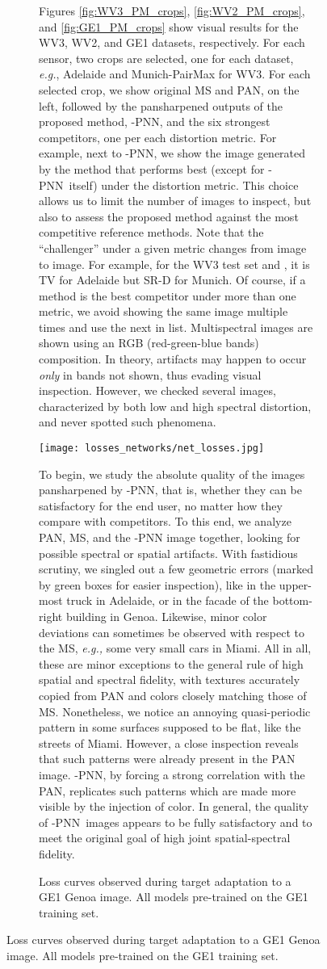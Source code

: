 \documentclass[journal]{IEEEtran}
\newcommand{\LPNN}  {-PNN}
\begin{document}
\begin{figure}
\begin{figure}
Figures \ref{fig:WV3_PM_crops}, \ref{fig:WV2_PM_crops}, and \ref{fig:GE1_PM_crops} show visual results for the WV3, WV2, and GE1 datasets, respectively.
For each sensor, two crops are selected, one for each dataset, {\it e.g.}, Adelaide and Munich-PairMax for WV3.
For each selected crop,
we show original MS and PAN, on the left,
followed by the pansharpened outputs of the proposed method, \LPNN, and the six strongest competitors, one per each distortion metric.
For example, next to \LPNN, we show the image generated by the method that performs best (except for \LPNN\ itself) under the  distortion metric.
This choice allows us to limit the number of images to inspect,
but also to assess the proposed method against the most competitive reference methods.
Note that the ``challenger'' under a given metric changes from image to image.
For example, for the WV3 test set and , it is TV for Adelaide but SR-D for Munich.
Of course, if a method is the best competitor under more than one metric, we avoid showing the same image multiple times and use the next in list.
Multispectral images are shown using an RGB (red-green-blue bands) composition.
In theory, artifacts may happen to occur {\em only} in bands not shown, thus evading visual inspection.
However, we checked several images, characterized by both low and high spectral distortion, and never spotted such phenomena.

\begin{figure*}[htbp]
\centering
\texttt{[image: losses\_networks/net\_losses.jpg]}
\caption{Loss curves observed during target adaptation to a GE1 Genoa image. All models pre-trained on the GE1 training set.}
\label{fig:network_effects}
\end{figure*}

To begin, we study the absolute quality of the images pansharpened by \LPNN,
that is, whether they can be satisfactory for the end user, no matter how they compare with competitors.
To this end, we analyze PAN, MS, and the {\LPNN} image together, looking for possible spectral or spatial artifacts.
With fastidious scrutiny, we singled out a few geometric errors (marked by green boxes for easier inspection), like in the upper-most truck in Adelaide,
or in the facade of the bottom-right building in Genoa.
Likewise, minor color deviations can sometimes be observed with respect to the MS, {\it e.g.,} some very small cars in Miami.
All in all, these are minor exceptions to the general rule of high spatial and spectral fidelity,
with textures accurately copied from PAN and colors closely matching those of MS.
Nonetheless, we notice an annoying quasi-periodic pattern in some surfaces supposed to be flat, like the streets of Miami.
However, a close inspection reveals that such patterns were already present in the PAN image.
\LPNN, by forcing a strong correlation with the PAN, replicates such patterns which are made more visible by the injection of color.
In general, the quality of \LPNN\ images appears to be fully satisfactory and to meet the original goal of high joint spatial-spectral fidelity.


\end{figure}
\end{figure}
\end{document}
